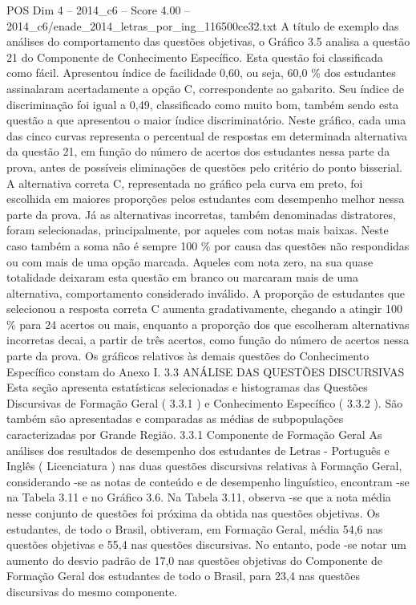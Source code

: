 \begin{textsample}{POS Dim 4 – 2014\_c6 – Score 4.00 – 2014\_c6/enade\_2014\_letras\_por\_ing\_116500ce32.txt}
A título de exemplo das análises do comportamento das questões objetivas, o Gráfico 3.5 analisa a questão 21 do Componente de Conhecimento Específico.
Esta questão foi classificada como fácil.
Apresentou índice de facilidade 0,60, ou seja, 60,0 \% dos estudantes assinalaram acertadamente a opção C, correspondente ao gabarito.
Seu índice de discriminação foi igual a 0,49, classificado como muito bom, também sendo esta questão a que apresentou o maior índice discriminatório.
Neste gráfico, cada uma das cinco curvas representa o percentual de respostas em determinada alternativa da questão 21, em função do número de acertos dos estudantes nessa parte da prova, antes de possíveis eliminações de questões pelo critério do ponto bisserial.
A alternativa correta C, representada no gráfico pela curva em preto, foi escolhida em maiores proporções pelos estudantes com desempenho melhor nessa parte da prova.
Já as alternativas incorretas, também denominadas distratores, foram selecionadas, principalmente, por aqueles com notas mais baixas.
Neste caso também a soma não é sempre 100 \% por causa das questões não respondidas ou com mais de uma opção marcada.
Aqueles com nota zero, na sua quase totalidade deixaram esta questão em branco ou marcaram mais de uma alternativa, comportamento considerado inválido.
A proporção de estudantes que selecionou a resposta correta C aumenta gradativamente, chegando a atingir 100 \% para 24 acertos ou mais, enquanto a proporção dos que escolheram alternativas incorretas decai, a partir de três acertos, como função do número de acertos nessa parte da prova.
Os gráficos relativos às demais questões do Conhecimento Específico constam do Anexo I. 3.3 ANÁLISE DAS QUESTÕES DISCURSIVAS Esta seção apresenta estatísticas selecionadas e histogramas das Questões Discursivas de Formação Geral ( 3.3.1 ) e Conhecimento Específico ( 3.3.2 ).
São também são apresentadas e comparadas as médias de subpopulações caracterizadas por Grande Região. 3.3.1 Componente de Formação Geral As análises dos resultados de desempenho dos estudantes de Letras - Português e Inglês ( Licenciatura ) nas duas questões discursivas relativas à Formação Geral, considerando -se as notas de conteúdo e de desempenho linguístico, encontram -se na Tabela 3.11 e no Gráfico 3.6.
Na Tabela 3.11, observa -se que a nota média nesse conjunto de questões foi próxima da obtida nas questões objetivas.
Os estudantes, de todo o Brasil, obtiveram, em Formação Geral, média 54,6 nas questões objetivas e 55,4 nas questões discursivas.
No entanto, pode -se notar um aumento do desvio padrão de 17,0 nas questões objetivas do Componente de Formação Geral dos estudantes de todo o Brasil, para 23,4 nas questões discursivas do mesmo componente.

\end{textsample}
